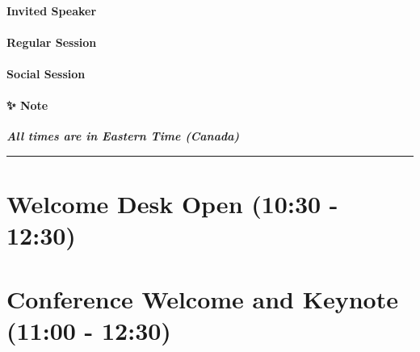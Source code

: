 \documentclass[
]{book}
\begin{document}
\begin{wp}
\hypertarget{invited-speaker}{%
\paragraph{Invited Speaker}\label{invited-speaker}}
\end{wp}

\begin{secondary}
\hypertarget{regular-session}{%
\paragraph{Regular Session}\label{regular-session}}
\end{secondary}
\begin{gh}
\hypertarget{social-session}{%
\paragraph{Social Session}\label{social-session}}
\end{gh}
\begin{protip}
\hypertarget{note}{%
\paragraph*{✨ Note}\label{note}}

\textbf{\emph{All times are in Eastern Time (Canada)}}
\end{protip}

\begin{center}\rule{0.5\linewidth}{0.5pt}\end{center}

\hypertarget{welcome-desk-open-1030---1230}{%
\section*{Welcome Desk Open (10:30 - 12:30)}\label{welcome-desk-open-1030---1230}}

\hypertarget{conference-welcome-and-keynote-1100---1230}{%
\section*{Conference Welcome and Keynote (11:00 - 12:30)}\label{conference-welcome-and-keynote-1100---1230}}
\end{document}
